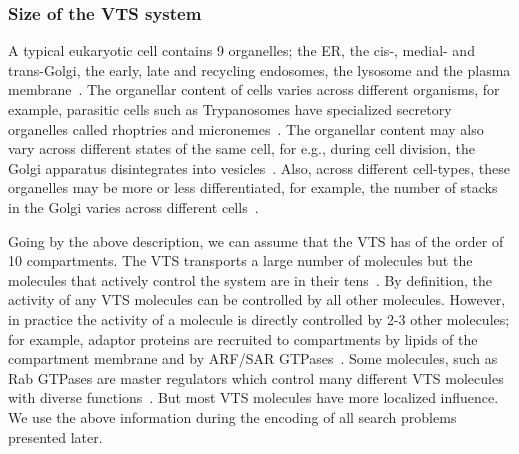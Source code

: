 \subsubsection{Size of the VTS system}
A typical eukaryotic cell contains 9 organelles; the ER, the cis-, medial- and trans-Golgi, the early, late and recycling endosomes, the lysosome and the plasma membrane~\cite{lodish2008molecular}. 
%
The organellar content of cells varies across different organisms, for example, parasitic cells such as Trypanosomes have specialized secretory organelles called rhoptries and micronemes~\cite{gubbels2012evolution}. 
%
The organellar content may also vary across different states of the same cell, for e.g., during cell division, the Golgi apparatus disintegrates into vesicles~\cite{tang2013cell}. 
%
Also, across different cell-types, these organelles may be more or less differentiated, for example, the number of stacks in the Golgi varies across different cells~\cite{polishchuk2004structural}. 
%

Going by the above description, we can assume that the VTS has of the order of 10 compartments. 
%
The VTS transports a large number of molecules but the molecules that actively control the system are in their tens~\cite{lodish2008molecular}. 
%
By definition, the activity of any VTS molecules can be controlled by all other molecules.
%
However, in practice the activity of a molecule is directly controlled by 2-3 other molecules; for example, adaptor proteins are recruited to compartments by lipids of the compartment membrane and by ARF/SAR GTPases~\cite{kahn2009toward}. 
%
Some molecules, such as Rab GTPases are master regulators which control many different VTS molecules with diverse functions~\cite{zerial2001rab}. 
%
But most VTS molecules have more localized influence.
%
We use the above information during the encoding of all search problems presented later.

